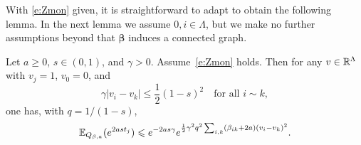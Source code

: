 \documentclass[11pt]{amsart}
\numberwithin{equation}{section}
\numberwithin{theorem}{section}
\newcommand{\V}[1]{\boldsymbol{#1}}
\begin{document}
With \eqref{e:Zmon} given, it is straightforward to adapt
\cite[Lemma 1]{1907.07949} to obtain the following lemma. In
the next lemma we assume $0,i\in\Lambda$, but we make no further
assumptions beyond that $\V{\beta}$ induces a connected graph.

\begin{lemma}[Sabot {\cite[Lemma 1]{1907.07949}} for $a=1/2$] \label{lem:Sabot}
  Let $a\geq 0$,  $s\in (0,1)$, and $\gamma >  0$. Assume~\eqref{e:Zmon} holds.
  Then for any $v \in \mathbb{R}^\Lambda$ with $v_j=1$, $v_{0}=0$, and
  \begin{equation}
    \gamma |v_i-v_k| \leq \frac12 (1-s)^2 \quad \text{for all $i\sim k$},
  \end{equation}
  one has, with $q=1/(1-s)$,
  \begin{equation} \label{e:Sabotbd}
    \mathbb{E}_{Q_{\beta,a}}(e^{2as t_j}) \leqslant e^{-2a s\gamma} e^{\frac12 \gamma^2q^2\sum_{i,k}(\beta_{ik}+2a)(v_i-v_k)^2}.
  \end{equation}
\end{lemma}
  
\end{document}

